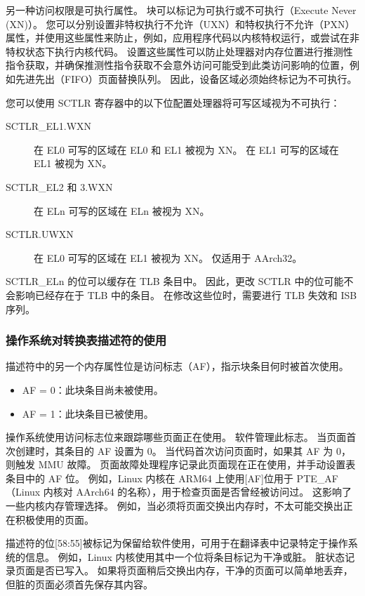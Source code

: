 另一种访问权限是可执行属性。
块可以标记为可执行或不可执行（Execute Never (XN)）。
您可以分别设置非特权执行不允许（UXN）和特权执行不允许（PXN）属性，并使用这些属性来防止，例如，应用程序代码以内核特权运行，或尝试在非特权状态下执行内核代码。
设置这些属性可以防止处理器对内存位置进行推测性指令获取，并确保推测性指令获取不会意外访问可能受到此类访问影响的位置，例如先进先出（FIFO）页面替换队列。
因此，设备区域必须始终标记为不可执行。


您可以使用 SCTLR 寄存器中的以下位配置处理器将可写区域视为不可执行：

\begin{description}
  \item[SCTLR\_EL1.WXN] 在 EL0 可写的区域在 EL0 和 EL1 被视为 XN。
  在 EL1 可写的区域在 EL1 被视为 XN。
  \item[SCTLR\_EL2 和 3.WXN] 在 ELn 可写的区域在 ELn 被视为 XN。
  \item[SCTLR.UWXN] 在 EL0 可写的区域在 EL1 被视为 XN。
  仅适用于 AArch32。
\end{description}

SCTLR\_ELn 的位可以缓存在 TLB 条目中。
因此，更改 SCTLR 中的位可能不会影响已经存在于 TLB 中的条目。
在修改这些位时，需要进行 TLB 失效和 ISB 序列。

\subsubsection{操作系统对转换表描述符的使用}

描述符中的另一个内存属性位是访问标志（AF），指示块条目何时被首次使用。

\begin{itemize}
  \item AF = 0：此块条目尚未被使用。
  \item AF = 1：此块条目已被使用。
\end{itemize}

操作系统使用访问标志位来跟踪哪些页面正在使用。
软件管理此标志。
当页面首次创建时，其条目的 AF 设置为 0。
当代码首次访问页面时，如果其 AF 为 0，则触发 MMU 故障。
页面故障处理程序记录此页面现在正在使用，并手动设置表条目中的 AF 位。
例如，Linux 内核在 ARM64 上使用{[}AF{]}位用于 PTE\_AF（Linux 内核对 AArch64 的名称），用于检查页面是否曾经被访问过。
这影响了一些内核内存管理选择。
例如，当必须将页面交换出内存时，不太可能交换出正在积极使用的页面。

描述符的位{[}58:55{]}被标记为保留给软件使用，可用于在翻译表中记录特定于操作系统的信息。
例如，Linux 内核使用其中一个位将条目标记为干净或脏。
脏状态记录页面是否已写入。
如果将页面稍后交换出内存，干净的页面可以简单地丢弃，但脏的页面必须首先保存其内容。

